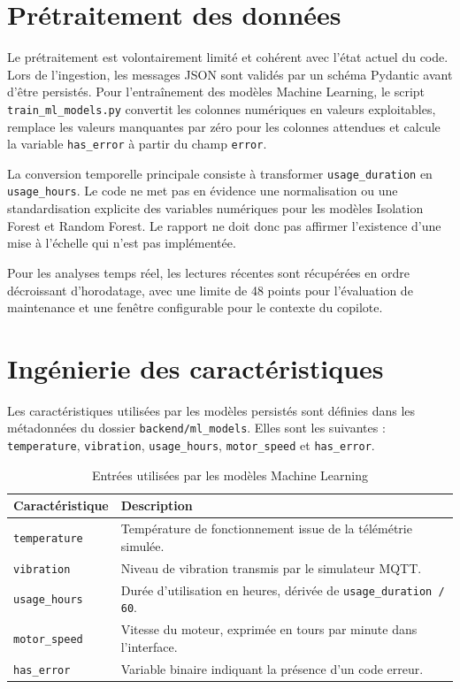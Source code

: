 \section{Prétraitement des données}

Le prétraitement est volontairement limité et cohérent avec l'état actuel du code. Lors de l'ingestion, les messages JSON sont validés par un schéma Pydantic avant d'être persistés. Pour l'entraînement des modèles Machine Learning, le script \texttt{train\_ml\_models.py} convertit les colonnes numériques en valeurs exploitables, remplace les valeurs manquantes par zéro pour les colonnes attendues et calcule la variable \texttt{has\_error} à partir du champ \texttt{error}.

La conversion temporelle principale consiste à transformer \texttt{usage\_duration} en \texttt{usage\_hours}. Le code ne met pas en évidence une normalisation ou une standardisation explicite des variables numériques pour les modèles Isolation Forest et Random Forest. Le rapport ne doit donc pas affirmer l'existence d'une mise à l'échelle qui n'est pas implémentée.

Pour les analyses temps réel, les lectures récentes sont récupérées en ordre décroissant d'horodatage, avec une limite de 48 points pour l'évaluation de maintenance et une fenêtre configurable pour le contexte du copilote.

\section{Ingénierie des caractéristiques}

Les caractéristiques utilisées par les modèles persistés sont définies dans les métadonnées du dossier \texttt{backend/ml\_models}. Elles sont les suivantes : \texttt{temperature}, \texttt{vibration}, \texttt{usage\_hours}, \texttt{motor\_speed} et \texttt{has\_error}.

\begin{table}[H]
\centering
\small
\caption{Entrées utilisées par les modèles Machine Learning}
\label{tab:features-modeles}
\begin{tabular}{|p{}|p{}|}
\hline
\rowcolor{SectionColor!12}
\textbf{Caractéristique} & \textbf{Description} \\
\hline
\texttt{temperature} & Température de fonctionnement issue de la télémétrie simulée. \\
\hline
\texttt{vibration} & Niveau de vibration transmis par le simulateur MQTT. \\
\hline
\texttt{usage\_hours} & Durée d'utilisation en heures, dérivée de \texttt{usage\_duration / 60}. \\
\hline
\texttt{motor\_speed} & Vitesse du moteur, exprimée en tours par minute dans l'interface. \\
\hline
\texttt{has\_error} & Variable binaire indiquant la présence d'un code erreur. \\
\hline
\end{tabular}
\end{table}

